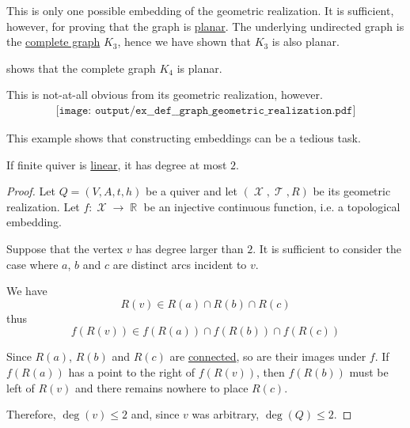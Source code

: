 \begin{example}
\begin{thmenum}
    This is only one possible embedding of the geometric realization. It is sufficient, however, for proving that the graph is \hyperref[def:quiver_geometric_realization/planar]{planar}. The underlying undirected graph is the \hyperref[ex:complete_graph]{complete graph} \( K_3 \), hence we have shown that \( K_3 \) is also planar.

      shows that the complete graph \( K_4 \) is planar.

    This is not-at-all obvious from its geometric realization, however.
    \begin{equation}\label{eq:ex:def:quiver_geometric_realization/k4/realization}
      \begin{aligned}
        \texttt{[image: output/ex\_\_def\_\_graph\_geometric\_realization.pdf]}
      \end{aligned}
    \end{equation}

    This example shows that constructing embeddings can be a tedious task.
  \end{thmenum}
\end{example}

\begin{proposition}\label{thm:linear_quiver_equivalence}
  If finite quiver is \hyperref[def:quiver_geometric_realization/linear]{linear}, it has degree at most \( 2 \).
\end{proposition}
\begin{proof}
  Let \( Q = (V, A, t, h) \) be a quiver and let \( (\mscrX, \mscrT, R) \) be its geometric realization. Let \( f: \mscrX \to \BbbR \) be an injective continuous function, i.e. a topological embedding.

  Suppose that the vertex \( v \) has degree larger than \( 2 \). It is sufficient to consider the case where \( a \), \( b \) and \( c \) are distinct arcs incident to \( v \).

  We have
  \begin{equation*}
    R(v) \in R(a) \cap R(b) \cap R(c)
  \end{equation*}
  thus
  \begin{equation*}
    f(R(v)) \in f(R(a)) \cap f(R(b)) \cap f(R(c))
  \end{equation*}

  Since \( R(a) \), \( R(b) \) and \( R(c) \) are \hyperref[def:connected_space]{connected}, so are their images under \( f \). If \( f(R(a)) \) has a point to the right of \( f(R(v)) \), then \( f(R(b)) \) must be left of \( R(v) \) and there remains nowhere to place \( R(c) \).

  Therefore, \( \deg(v) \leq 2 \) and, since \( v \) was arbitrary, \( \deg(Q) \leq 2 \).
\end{proof}

